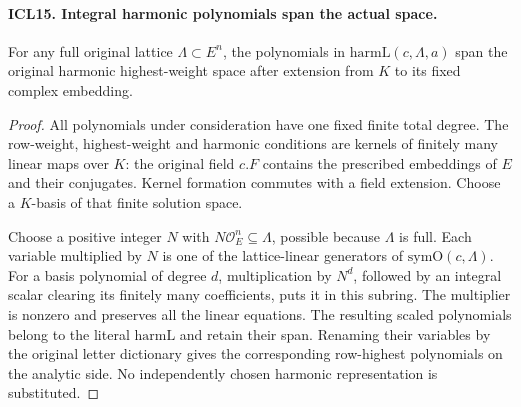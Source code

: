 \documentclass[11pt,a4paper]{article}
\numberwithin{equation}{section}
\theoremstyle{remark}\newtheorem{remark}[theorem]{Remark}
\begin{document}
\paragraph{ICL15. Integral harmonic polynomials span the actual space.}
\label{claim:ICL15}
For any full original lattice \(\Lambda\subset E^n\),
the polynomials in \(\mathrm{harmL}(c,\Lambda,a)\)
span the original harmonic highest-weight space after
extension from \(K\) to its fixed complex embedding.
\begin{proof}
All polynomials under consideration have one fixed
finite total degree.  The row-weight, highest-weight
and harmonic conditions are kernels of finitely many
linear maps over \(K\): the original field \(c.F\)
contains the prescribed embeddings of \(E\) and their
conjugates.  Kernel formation commutes with a field
extension.  Choose a \(K\)-basis of that finite
solution space.

Choose a positive integer \(N\) with
\(N\mathcal O_E^n\subseteq\Lambda\), possible because
\(\Lambda\) is full.  Each variable multiplied by
\(N\) is one of the lattice-linear generators of
\(\mathrm{symO}(c,\Lambda)\).  For a basis polynomial
of degree \(d\), multiplication by \(N^d\), followed
by an integral scalar clearing its finitely many
coefficients, puts it in this subring.  The multiplier
is nonzero and preserves all the linear equations.
The resulting scaled polynomials belong to the
literal \(\mathrm{harmL}\) and retain their span.
Renaming their variables by the original letter
dictionary gives the corresponding row-highest
polynomials on the analytic side.  No independently
chosen harmonic representation is substituted.
\end{proof}

\end{document}
